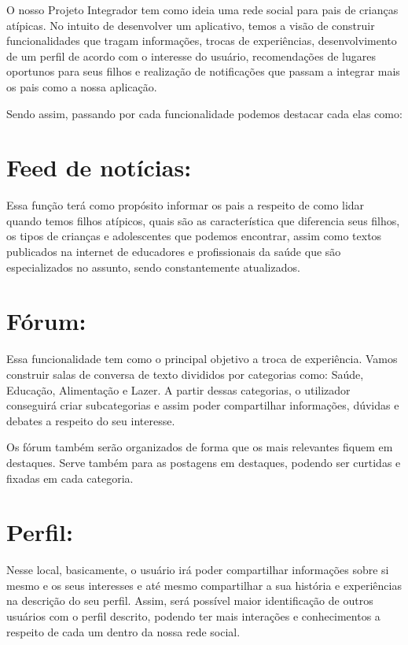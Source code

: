 \begin{apendicesenv}
	O nosso Projeto Integrador tem como ideia uma rede social para pais de crianças atípicas. No intuito de desenvolver um aplicativo, temos a visão de construir funcionalidades que tragam informações, trocas de experiências, desenvolvimento de um perfil de acordo com o interesse do usuário, recomendações de lugares oportunos para seus filhos e realização de notificações que passam a integrar mais os pais como a nossa aplicação. 
	
	Sendo assim, passando por cada funcionalidade podemos destacar cada elas como: 
	
	
	
	
	
	\section{Feed de notícias:}
	Essa função terá como propósito informar os pais a respeito de como lidar quando temos filhos atípicos, quais são as característica que diferencia seus filhos, os tipos de crianças e adolescentes que podemos encontrar, assim como textos publicados na internet de educadores e profissionais da saúde que são especializados no assunto, sendo constantemente atualizados. 
	
	\section{Fórum:}
	Essa funcionalidade tem como o principal objetivo a troca de experiência. Vamos construir salas de conversa de texto divididos por categorias como: Saúde, Educação, Alimentação e Lazer. A partir dessas categorias, o utilizador conseguirá criar subcategorias e assim poder compartilhar informações, dúvidas e debates a respeito do seu interesse.
	
	Os fórum também serão organizados de forma que os mais relevantes fiquem em destaques. Serve também para as postagens em destaques, podendo ser curtidas e fixadas em cada categoria. 
	
	\section{Perfil:}
	Nesse local, basicamente, o usuário irá poder compartilhar informações sobre si mesmo e os seus interesses e até mesmo compartilhar a sua história e experiências na descrição do seu perfil. Assim, será possível maior identificação de outros usuários com o perfil descrito, podendo ter mais interações e conhecimentos a respeito de cada um dentro da nossa rede social. 
	

\end{apendicesenv}
